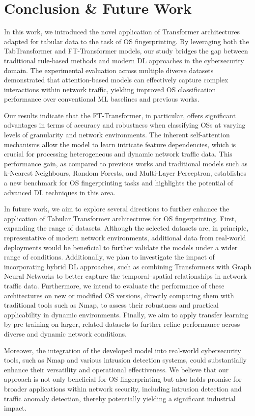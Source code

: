 \section{Conclusion \& Future Work}
\label{sec:conclusion_future_work}

In this work, we introduced the novel application of Transformer architectures adapted for tabular data to the task of OS fingerprinting. By leveraging both the TabTransformer and FT-Transformer models, our study bridges the gap between traditional rule-based methods and modern DL approaches in the cybersecurity domain. The experimental evaluation across multiple diverse datasets demonstrated that attention-based models can effectively capture complex interactions within network traffic, yielding improved OS classification performance over conventional ML baselines and previous works.

Our results indicate that the FT-Transformer, in particular, offers significant advantages in terms of accuracy and robustness when classifying OSs at varying levels of granularity and network environments. The inherent self-attention mechanisms allow the model to learn intricate feature dependencies, which is crucial for processing heterogeneous and dynamic network traffic data. This performance gain, as compared to previous works and traditional models such as k-Nearest Neighbours, Random Forests, and Multi-Layer Perceptron, establishes a new benchmark for OS fingerprinting tasks and highlights the potential of advanced DL techniques in this area.

In future work, we aim to explore several directions to further enhance the application of Tabular Transformer architectures for OS fingerprinting. First, expanding the range of datasets. Although the selected datasets are, in principle, representative of modern network environments, additional data from real-world deployments would be beneficial to further validate the models under a wider range of conditions. Additionally, we plan to investigate the impact of incorporating hybrid DL approaches, such as combining Transformers with Graph Neural Networks to better capture the temporal–spatial relationships in network traffic data. Furthermore, we intend to evaluate the performance of these architectures on new or modified OS versions, directly comparing them with traditional tools such as Nmap, to assess their robustness and practical applicability in dynamic environments. Finally, we aim to apply transfer learning by pre-training on larger, related datasets to further refine performance across diverse and dynamic network conditions.

Moreover, the integration of the developed model into real-world cybersecurity tools, such as Nmap and various intrusion detection systems, could substantially enhance their versatility and operational effectiveness. We believe that our approach is not only beneficial for OS fingerprinting but also holds promise for broader applications within network security, including intrusion detection and traffic anomaly detection, thereby potentially yielding a significant industrial impact.

